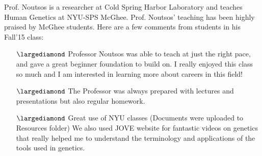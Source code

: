\documentclass[a4paper]{article}
\begin{document}
Prof. Noutsos is a researcher at Cold Spring Harbor Laboratory and teaches Human Genetics at NYU-SPS McGhee. Prof. Noutsos' teaching has been highly praised by McGhee students. Here are a few comments from students in his Fall'15 class:

\begin{itemize}
\item[$\largediamond$] Professor Noutsos was able to teach at just the right pace, and gave a great beginner foundation to build on. I really enjoyed this class so much and I am interested in learning more about careers in this field!
\item[$\largediamond$] The Professor was always prepared with lectures and presentations but also regular homework.
\item[$\largediamond$] Great use of NYU classes (Documents were uploaded to Resources folder) We also used JOVE website for fantastic videos on genetics that really helped me to understand the terminology and applications of the tools used in genetics.
\end{itemize}
\endgroup

\begin{center}
 \par
\end{center}
\end{document}
